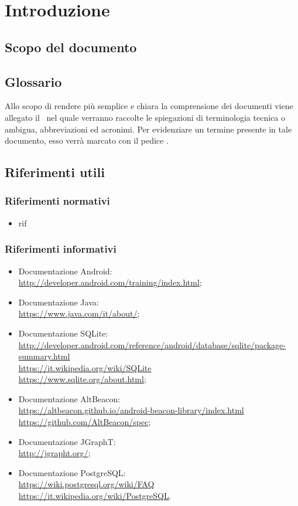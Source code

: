 \documentclass[../SpecificaTecnica.tex]{subfiles}
\begin{document}
\section{Introduzione}
	\subsection{Scopo del documento}
	
	\subsection{Glossario} \label{sec:Glossario}
	Allo scopo di rendere più semplice e chiara la comprensione dei documenti viene allegato il \glossariov\ nel quale verranno raccolte le spiegazioni di  terminologia tecnica o  ambigua,
	abbreviazioni ed acronimi. Per evidenziare un termine presente in tale documento, esso verrà marcato con il pedice \g.
	\subsection{Riferimenti utili}
		\subsubsection{Riferimenti normativi}
		\begin{itemize}
			\item rif
		\end{itemize}
		\subsubsection{Riferimenti informativi}
		\begin{itemize}
			\item Documentazione Android: \\ \url{http://developer.android.com/training/index.html};
			\item Documentazione Java: \\ \url{https://www.java.com/it/about/};
			\item Documentazione SQLite: \\ \url{http://developer.android.com/reference/android/database/sqlite/package-summary.html} \\ \url{https://it.wikipedia.org/wiki/SQLite} \\ \url{https://www.sqlite.org/about.html};
			\item Documentazione AltBeacon: \\ \url{https://altbeacon.github.io/android-beacon-library/index.html} \\ \url{https://github.com/AltBeacon/spec};
			\item Documentazione JGraphT: \\ \url{http://jgrapht.org/};
			\item Documentazione PostgreSQL: \\ \url{https://wiki.postgresql.org/wiki/FAQ} \\ \url{https://it.wikipedia.org/wiki/PostgreSQL}.
			
		\end{itemize}
\end{document}
